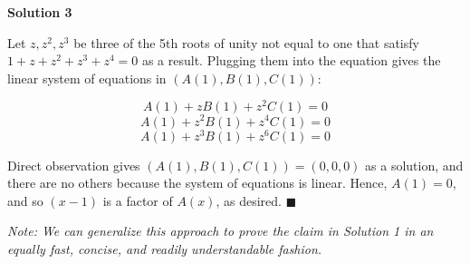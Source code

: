 \begin{enumerate}
\textbf{Solution 3}

Let $z, z^2, z^3$ be three of the 5th roots of unity not equal to one that satisfy $1 + z + z^2 + z^3 + z^4 = 0$ as a result. Plugging them into the equation gives the linear system of equations in $(A(1), B(1), C(1))$:

 
 \[A(1) + zB(1) + z^2C(1) = 0\]
 \[A(1) + z^2B(1) + z^4C(1) = 0\]
 \[A(1) + z^3B(1) + z^6C(1) = 0\]

 Direct observation gives $(A(1), B(1), C(1)) = (0,0,0)$ as a solution, and there are no others because the system of equations is linear. Hence, $A(1) = 0$, and so $(x-1)$ is a factor of $A(x)$, as desired. $\blacksquare$

 \textit{Note: We can generalize this approach to prove the claim in Solution 1 in an equally fast, concise, and readily understandable fashion.}

 


\end{enumerate}